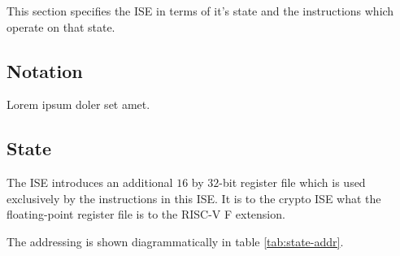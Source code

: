 
This section specifies the ISE in terms of it's state and the instructions
which operate on that state.

\subsection{Notation}

Lorem ipsum doler set amet.


\subsection{State}

The ISE introduces an additional $16$ by $32$-bit register file which
is used exclusively by the instructions in this ISE. It is to the
crypto ISE what the floating-point register file is to the RISC-V
F extension.

The addressing is shown diagrammatically in table \ref{tab:state-addr}.

